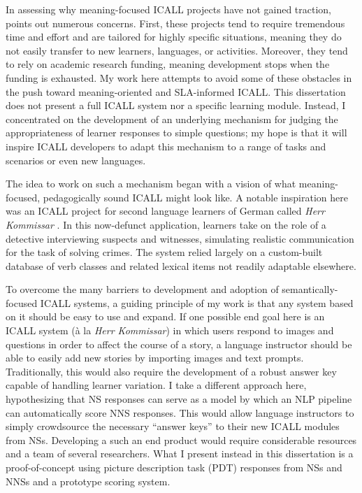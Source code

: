 In assessing why meaning-focused ICALL projects have not gained traction, \citet{schulze2010taking} points out numerous concerns. First, these projects tend to require tremendous time and effort and are tailored for highly specific situations, meaning they do not easily transfer to new learners, languages, or activities. Moreover, they tend to rely on academic research funding, meaning development stops when the funding is exhausted. My work here attempts to avoid some of these obstacles in the push toward meaning-oriented and SLA-informed ICALL. This dissertation does not present a full ICALL system nor a specific learning module. Instead, I concentrated on the development of an underlying mechanism for judging the appropriateness of learner responses to simple questions; my hope is that it will inspire ICALL developers to adapt this mechanism to a range of tasks and scenarios or even new languages.

The idea to work on such a mechanism began with a vision of what meaning-focused, pedagogically sound ICALL might look like. A notable inspiration here was an ICALL project for second language learners of German called \textit{Herr Kommissar} \cite{desmedt:95}. In this now-defunct application, learners take on the role of a detective interviewing suspects and witnesses, simulating realistic communication for the task of solving crimes. The system relied largely on a custom-built database of verb classes and related lexical items not readily adaptable elsewhere.

To overcome the many barriers to development and adoption of semantically-focused ICALL systems, a guiding principle of my work is that any system based on it should be easy to use and expand. If one possible end goal here is an ICALL system (\`a la \textit{Herr Kommissar}) in which users respond to images and questions in order to affect the course of a story, a language instructor should be able to easily add new stories by importing images and text prompts. Traditionally, this would also require the development of a robust answer key capable of handling learner variation. I take a different approach here, hypothesizing that NS responses can serve as a model by which an NLP pipeline can automatically score NNS responses. This would allow language instructors to simply crowdsource the necessary ``answer keys'' to their new ICALL modules from NSs. Developing a such an end product would require considerable resources and a team of several researchers. What I present instead in this dissertation is a proof-of-concept using picture description task (PDT) responses from NSs and NNSs and a prototype scoring system.


